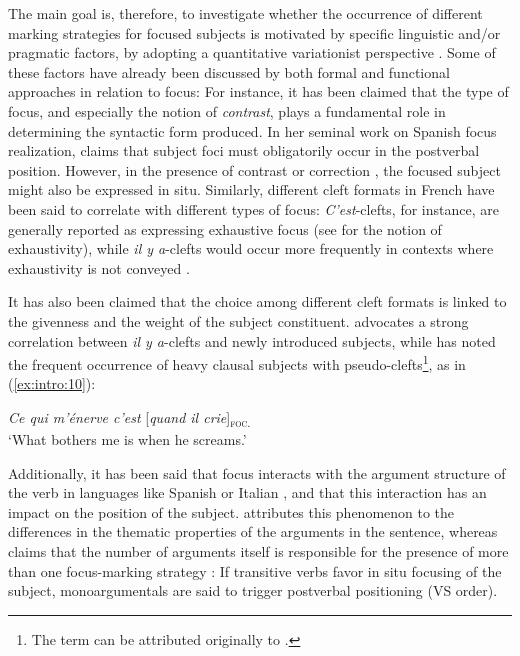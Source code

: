 The main goal is, therefore, to investigate whether the occurrence of different marking strategies for focused subjects is motivated by specific linguistic and/or pragmatic factors, by adopting a quantitative variationist perspective \parencite{labov1972sociolinguistic}. Some of these factors have already been discussed by both formal and functional approaches in relation to focus: For instance, it has been claimed that the type of focus, and especially the notion of \textit{contrast}, plays a fundamental role in determining the syntactic form produced. In her seminal work on Spanish focus realization, \textcite{zubizarreta1998prosody} claims that subject foci must obligatorily occur in the postverbal position. However, in the presence of contrast or correction \parencite{van2004incompatibility, steube2001correction, REPP20101333}, the focused subject might also be expressed in situ. Similarly, different cleft formats in French have been said to correlate with different types of focus: \textit{C'est}-clefts, for instance, are generally reported as expressing exhaustive focus (see \cite{kiss1998identificational} for the notion of exhaustivity), while \textit{il y a}-clefts would occur more frequently in contexts where exhaustivity is not conveyed \parencite{de2015status, karssenberg2017oiseaux}. 

It has also been claimed that the choice among different cleft formats is linked to the givenness \parencite{firbas1966non, chafe1970meaning, prince1992zpg} and the weight of the subject constituent. \textcite{lambrecht1996information} advocates a strong correlation between \textit{il y a}-clefts and newly introduced subjects, while \textcite{roubaud2000constructions} has noted the frequent occurrence of heavy clausal subjects with pseudo-clefts\footnote{The term can be attributed originally to \textcite{bach1968english}.}, as in (\ref{ex:intro:10}):

 \ea \label{ex:intro:10}
  \textit{Ce qui m'énerve c'est} {[\textit{quand il crie}}]\textsubscript{\textsc{foc.}}\normalsize\\
 `What bothers me is when he screams.' \hfill \parencite[178]{roubaud2000constructions}    
\z


Additionally, it has been said that focus interacts with the argument structure of the verb in languages like Spanish or Italian \parencite{burzio1986italian, rizzi1982issues, belletti1988case}, and that this interaction has an impact on the position of the subject. \textcite{gutierrez2013structural} attributes this phenomenon to the differences in the thematic properties of the arguments in the sentence, whereas \textcite{gabriel2007fokus} claims that the number of arguments itself is responsible for the presence of more than one focus-marking strategy : If transitive verbs favor in situ focusing of the subject, monoargumentals are said to trigger postverbal positioning (VS order).

